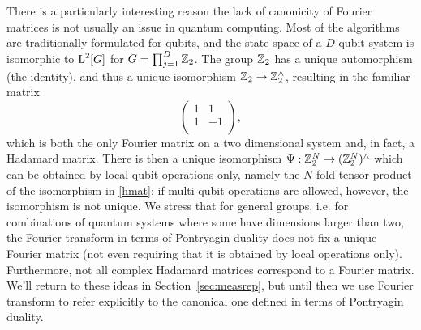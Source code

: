 There is a particularly interesting reason the lack of canonicity of Fourier matrices is not usually an issue in quantum computing. Most of the algorithms are traditionally formulated for qubits, and the state-space of a $D$-qubit system is isomorphic to $\operatorname{L}^2[G]$ for $G = \prod_{j=1}^D \mathbb{Z}_{2}$. The group $\mathbb{Z}_{2}$ has a unique automorphism (the identity), and thus a unique isomorphism $\mathbb{Z}_{2} \rightarrow \mathbb{Z}_{2}^\wedge$, resulting in the familiar matrix
\begin{equation}
\label{hmat}
\begin{pmatrix}1 & 1 \\
1 & -1 \\
\end{pmatrix},
\end{equation}
which is both the only Fourier matrix on a two dimensional system and, in fact, a Hadamard matrix. There is then a unique isomorphism $\Psi : \mathbb{Z}_{2}^N \rightarrow (\mathbb{Z}_{2}^N)^\wedge$ which can be obtained by local qubit operations only, namely the $N$-fold tensor product of the isomorphism in \ref{hmat}; if multi-qubit operations are allowed, however, the isomorphism is not unique. We stress that for general groups, i.e. for combinations of quantum systems where some have dimensions larger than two, the Fourier transform in terms of Pontryagin duality does not fix a unique Fourier matrix (not even requiring that it is obtained by local operations only). Furthermore, not all complex Hadamard matrices correspond to a Fourier matrix. We'll return to these ideas in Section~\ref{sec:measrep}, but until then we use Fourier transform to refer explicitly to the canonical one defined in terms of Pontryagin duality.

